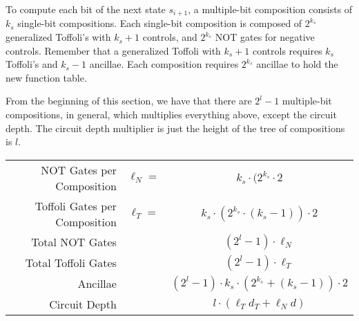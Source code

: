 To compute each bit of the next state
$s_{i+1}$, a multiple-bit composition consists of 
$k_s$ single-bit compositions. Each single-bit composition is
composed of $2^{k_s}$ generalized Toffoli's with $k_s +1$ controls, and
$2^{k_s}$ NOT gates for negative controls. Remember that a generalized
Toffoli with $k_s + 1$ controls requires $k_s$ Toffoli's and $k_s - 1$
ancillae. Each composition requires $2^{k_s}$ ancillae to
hold the new function table.

From the beginning of this section, we have that there are $2^l - 1$
multiple-bit compositions, in general, which multiplies everything above,
except the circuit depth. The circuit depth multiplier is
just the height of the tree of compositions is $l$.

\begin{table}
\begin{center}
\begin{tabular}{|r|cc|}
\hline
NOT Gates per Composition & $\ell_N = $ & $k_s \cdot (2^{k_s} \cdot 2$ \\
Toffoli Gates per Composition & $\ell_T = $ & $k_s \cdot (2^{k_s}\cdot (k_s-1)) \cdot 2$\\
Total NOT Gates & & $(2^l - 1) \cdot \ell_N$ \\
Total Toffoli Gates & & $(2^l - 1) \cdot \ell_T$ \\
Ancillae & & $(2^l - 1)\cdot k_s \cdot (2^{k_s} + (k_s - 1)) \cdot 2$\\
Circuit Depth & & $l\cdot(\ell_T d_T + \ell_N d)$\\
\hline
\end{tabular}
\end{center}
\end{table}